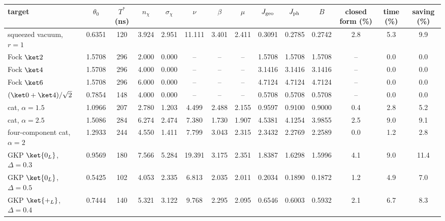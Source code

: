 \begin{tabular}{lccccccccccccc}
target & $\theta_0$ & $T^*$ (ns) & $n_\chi$ & $\sigma_\chi$ & $\nu$ & $\beta$ & $\mu$ & $J_{\rm geo}$ & $J_{\rm ph}$ & $B$ & closed form (\%) & time (\%) & saving (\%)\\\hline
squeezed vacuum, $r=1$ & 0.6351 & 120 & 3.924 & 2.951 & 11.111 & 3.401 & 2.411 & 0.3091 & 0.2785 & 0.2742 & 2.8 & 5.3 & 9.9\\
Fock $\ket2$ & 1.5708 & 296 & 2.000 & 0.000 & -- & -- & -- & 1.5708 & 1.5708 & 1.5708 & -- & 0.0 & 0.0\\
Fock $\ket4$ & 1.5708 & 296 & 4.000 & 0.000 & -- & -- & -- & 3.1416 & 3.1416 & 3.1416 & -- & 0.0 & 0.0\\
Fock $\ket6$ & 1.5708 & 296 & 6.000 & 0.000 & -- & -- & -- & 4.7124 & 4.7124 & 4.7124 & -- & 0.0 & 0.0\\
$(\ket0+\ket4)/\sqrt2$ & 0.7854 & 148 & 4.000 & 0.000 & -- & -- & -- & 0.5708 & 0.5708 & 0.5708 & -- & 0.0 & 0.0\\
cat, $\alpha=1.5$ & 1.0966 & 207 & 2.780 & 1.203 & 4.499 & 2.488 & 2.155 & 0.9597 & 0.9100 & 0.9000 & 0.4 & 2.8 & 5.2\\
cat, $\alpha=2.5$ & 1.5086 & 284 & 6.274 & 2.474 & 7.380 & 1.730 & 1.907 & 4.5381 & 4.1254 & 3.9855 & 2.5 & 9.0 & 9.1\\
four-component cat, $\alpha=2$ & 1.2933 & 244 & 4.550 & 1.411 & 7.799 & 3.043 & 2.315 & 2.3432 & 2.2769 & 2.2589 & 0.0 & 1.2 & 2.8\\
GKP $\ket{0_L}$, $\Delta=0.3$ & 0.9569 & 180 & 7.566 & 5.284 & 19.391 & 3.175 & 2.351 & 1.8387 & 1.6298 & 1.5996 & 4.1 & 9.0 & 11.4\\
GKP $\ket{0_L}$, $\Delta=0.5$ & 0.5425 & 102 & 4.053 & 2.335 & 6.813 & 2.035 & 2.011 & 0.2034 & 0.1890 & 0.1872 & 1.2 & 4.9 & 7.0\\
GKP $\ket{+_L}$, $\Delta=0.4$ & 0.7444 & 140 & 5.321 & 3.122 & 9.768 & 2.295 & 2.095 & 0.6546 & 0.6003 & 0.5932 & 2.1 & 6.7 & 8.3\\
\end{tabular}
